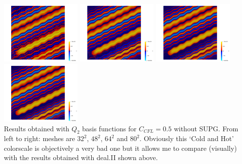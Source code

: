 \begin{center}
\includegraphics[width=4cm]{python_codes/fieldstone_43/results/experiment9/T32.png}
\includegraphics[width=4cm]{python_codes/fieldstone_43/results/experiment9/T48.png}
\includegraphics[width=4cm]{python_codes/fieldstone_43/results/experiment9/T64.png}
\includegraphics[width=4cm]{python_codes/fieldstone_43/results/experiment9/T80.png}\\
{\captionfont Results obtained with $Q_2$ basis functions for $C_{CFL}=0.5$ without SUPG. 
From left to right: meshes are $32^2$, $48^2$, $64^2$ and $80^2$. Obviously this `Cold and Hot' 
colorscale is objectively a very bad one but it allows me to compare (visually) with the results obtained with
deal.II shown above.}
\end{center}

